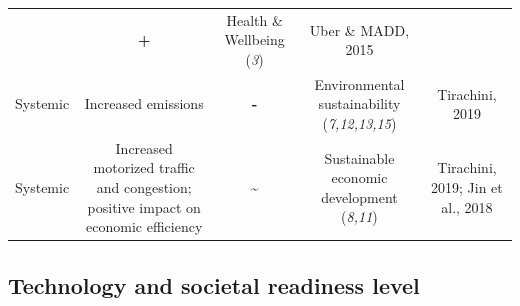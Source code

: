 \documentclass[
]{book}
\begin{document}
\begin{longtable}[]{@{}ccccc@{}}
\begin{minipage}[t]{0.16\columnwidth}
\end{minipage} & \begin{minipage}[t]{0.17\columnwidth}\centering
\textbf{+}\strut
\end{minipage} & \begin{minipage}[t]{0.17\columnwidth}\centering
Health \& Wellbeing (\emph{3})\strut
\end{minipage} & \begin{minipage}[t]{0.17\columnwidth}\centering
Uber \& MADD, 2015\strut
\end{minipage}\tabularnewline
\begin{minipage}[t]{0.17\columnwidth}\centering
Systemic\strut
\end{minipage} & \begin{minipage}[t]{0.16\columnwidth}\centering
Increased emissions\strut
\end{minipage} & \begin{minipage}[t]{0.17\columnwidth}\centering
\textbf{-}\strut
\end{minipage} & \begin{minipage}[t]{0.17\columnwidth}\centering
Environmental sustainability (\emph{7,12,13,15})\strut
\end{minipage} & \begin{minipage}[t]{0.17\columnwidth}\centering
Tirachini, 2019\strut
\end{minipage}\tabularnewline
\begin{minipage}[t]{0.17\columnwidth}\centering
Systemic\strut
\end{minipage} & \begin{minipage}[t]{0.16\columnwidth}\centering
Increased motorized traffic and congestion; positive impact on economic efficiency\strut
\end{minipage} & \begin{minipage}[t]{0.17\columnwidth}\centering
\textbf{\textasciitilde{}}\strut
\end{minipage} & \begin{minipage}[t]{0.17\columnwidth}\centering
Sustainable economic development (\emph{8,11})\strut
\end{minipage} & \begin{minipage}[t]{0.17\columnwidth}\centering
Tirachini, 2019; Jin et al., 2018\strut
\end{minipage}\tabularnewline
\bottomrule
\end{longtable}

\hypertarget{technology-and-societal-readiness-level-45}{%
\subsection*{Technology and societal readiness level}\label{technology-and-societal-readiness-level-45}}
\end{document}

